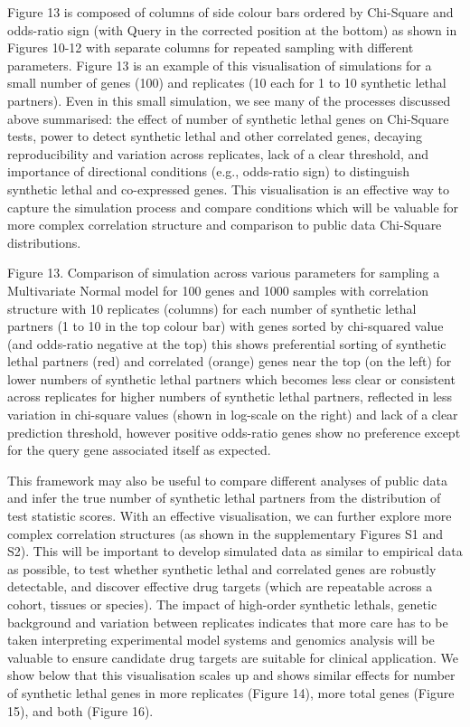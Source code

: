 Figure 13 is composed of columns of side colour bars ordered by Chi-Square and odds-ratio sign (with Query in the corrected position at the bottom) as shown in Figures 10-12 with separate columns for repeated sampling with different parameters.  Figure 13 is an example of this visualisation of simulations for a small number of genes (100) and replicates (10 each for 1 to 10 \gls{synthetic lethal} partners).  Even in this small simulation, we see many of the processes discussed above summarised: the effect of number of \gls{synthetic lethal} genes on Chi-Square tests, power to detect \gls{synthetic lethal} and other correlated genes, decaying reproducibility and variation across replicates, lack of a clear threshold, and importance of directional conditions (e.g., odds-ratio sign) to distinguish \gls{synthetic lethal} and co-expressed genes.  This visualisation is an effective way to capture the simulation process and compare conditions which will be valuable for more complex correlation structure and comparison to public data Chi-Square distributions.
    
Figure 13.  Comparison of simulation across various parameters for sampling a Multivariate Normal model for 100 genes and 1000 samples with correlation structure with 10 replicates (columns) for each number of \gls{synthetic lethal} partners (1 to 10 in the top colour bar) with genes sorted by chi-squared value (and odds-ratio negative at the top) this shows preferential sorting of \gls{synthetic lethal} partners (red) and correlated (orange) genes near the top (on the left) for lower numbers of \gls{synthetic lethal} partners which becomes less clear or consistent across replicates for higher numbers of \gls{synthetic lethal} partners, reflected in less variation in chi-square values (shown in log-scale on the right) and lack of a clear prediction threshold, however positive odds-ratio genes show no preference except for the query gene associated itself as expected.

This framework may also be useful to compare different analyses of public data and infer the true number of \gls{synthetic lethal} partners from the distribution of test statistic scores.  With an effective visualisation, we can further explore more complex correlation structures (as shown in the supplementary Figures S1 and S2).  This will be important to develop simulated data as similar to empirical data as possible, to test whether \gls{synthetic lethal} and correlated genes are robustly detectable, and discover effective drug targets (which are repeatable across a cohort, tissues or species).  The impact of high-order \glspl{synthetic lethal}, genetic background and variation between replicates indicates that more care has to be taken interpreting experimental model systems and \glspl{genomic} analysis will be valuable to ensure candidate drug targets are suitable for clinical application.  We show below that this visualisation scales up and shows similar effects for number of \gls{synthetic lethal} genes in more replicates (Figure 14), more total genes (Figure 15), and both (Figure 16).
    
